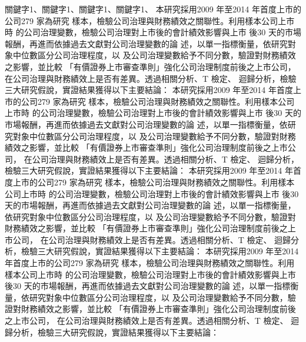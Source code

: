 \documentclass[
    添加扉页=是,
    添加原創聲明頁=是,
    添加校徽水印=是,
    奇偶页邊距對稱=不,
]{.def/must}
\begin{document}
\begin{abstract@cn}{關鍵字1、關鍵字1、關鍵字1、關鍵字1、}
本研究採用2009 年至2014 年首度上市的公司279 家為研究
樣本，檢驗公司治理與財務績效之關聯性。利用樣本公司上市時
的公司治理變數，檢驗公司治理對上市後的會計績效影響與上市
後30 天的市場報酬，再進而依據過去文獻對公司治理變數的論
述，以單一指標衡量，依研究對象中位數區分公司治理程度，以
及公司治理變數給予不同分數，驗證對財務績效之影響，並比較
「有價證券上市審查準則」強化公司治理制度前後之上市公司，
在公司治理與財務績效上是否有差異。透過相關分析、T 檢定、
迴歸分析，檢驗三大研究假說，實證結果獲得以下主要結論：
本研究採用2009 年至2014 年首度上市的公司279 家為研究
樣本，檢驗公司治理與財務績效之關聯性。利用樣本公司上市時
的公司治理變數，檢驗公司治理對上市後的會計績效影響與上市
後30 天的市場報酬，再進而依據過去文獻對公司治理變數的論
述，以單一指標衡量，依研究對象中位數區分公司治理程度，以
及公司治理變數給予不同分數，驗證對財務績效之影響，並比較
「有價證券上市審查準則」強化公司治理制度前後之上市公司，
在公司治理與財務績效上是否有差異。透過相關分析、T 檢定、
迴歸分析，檢驗三大研究假說，實證結果獲得以下主要結論：
本研究採用2009 年至2014 年首度上市的公司279 家為研究
樣本，檢驗公司治理與財務績效之關聯性。利用樣本公司上市時
的公司治理變數，檢驗公司治理對上市後的會計績效影響與上市
後30 天的市場報酬，再進而依據過去文獻對公司治理變數的論
述，以單一指標衡量，依研究對象中位數區分公司治理程度，以
及公司治理變數給予不同分數，驗證對財務績效之影響，並比較
「有價證券上市審查準則」強化公司治理制度前後之上市公司，
在公司治理與財務績效上是否有差異。透過相關分析、T 檢定、
迴歸分析，檢驗三大研究假說，實證結果獲得以下主要結論：
本研究採用2009 年至2014 年首度上市的公司279 家為研究
樣本，檢驗公司治理與財務績效之關聯性。利用樣本公司上市時
的公司治理變數，檢驗公司治理對上市後的會計績效影響與上市
後30 天的市場報酬，再進而依據過去文獻對公司治理變數的論
述，以單一指標衡量，依研究對象中位數區分公司治理程度，以
及公司治理變數給予不同分數，驗證對財務績效之影響，並比較
「有價證券上市審查準則」強化公司治理制度前後之上市公司，
在公司治理與財務績效上是否有差異。透過相關分析、T 檢定、
迴歸分析，檢驗三大研究假說，實證結果獲得以下主要結論：
\end{abstract@cn}
\end{document}
